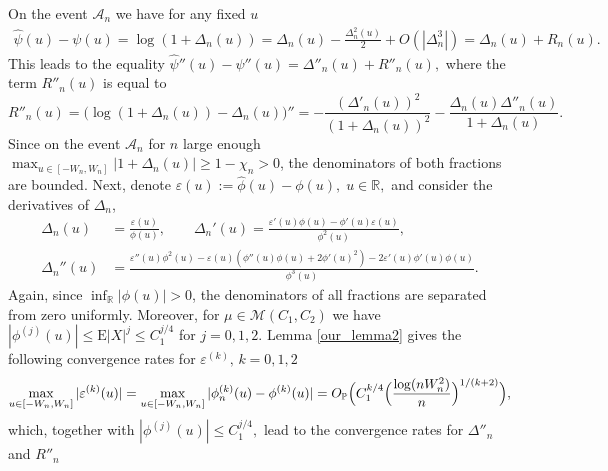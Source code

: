 \documentclass[numbers,webpdf,imaiai]{ima-authoring-template}%
\theoremstyle{thmstyletwo}%
\newcommand{\R}{\mathbb{R}}
\newcommand{\E}{\mathrm{E}}
\newcommand{\A}{\mathcal{A}}
\numberwithin{equation}{section}
\begin{document}
\begin{enumerate}
On the event $\A_n$ we have for any fixed $u$ 
\begin{align*}
    \widehat\psi(u) - \psi(u) = \log(1 + \Delta_n(u))
    = \Delta_n(u)  - \frac{\Delta_n^2(u)}{2} + O(|\Delta_n^3|) = \Delta_n(u) + R_n(u).
\end{align*}
This leads to the equality 
\(
    \widehat{\psi}''(u) - \psi''(u) = \Delta''_n(u) + R''_n(u),\)
where the term $R''_n(u)$ is equal to 
\begin{equation*}
    R''_n(u) = \bigl(    \log(1 + \Delta_n(u)) - \Delta_n(u) \bigr)'' = 
    -\frac{(\Delta'_n(u))^2}{(1 + \Delta_n(u))^2} - \frac{\Delta_n(u)\Delta''_n(u)}{1 + \Delta_n(u)}.
\end{equation*}
Since on the event $\A_n$ for $n$ large enough $\max_{u \in [-W_n, W_n]} |1 + \Delta_n(u)| \geq 1 - \chi_n > 0$, the  denominators of both fractions are bounded. Next, denote $\varepsilon (u) := \widehat{\phi}(u) - \phi(u), \; u \in \R,$ and consider the derivatives of $\Delta_n$,
\begin{align*}
    \Delta_n(u) &=  \frac{\varepsilon(u)}{\phi(u)}, \qquad 
    \Delta_n'(u) = \frac{\varepsilon'(u) \phi(u) - \phi'(u)\varepsilon(u)}{\phi^2(u)}, \\
    \Delta_n''(u) &= \frac{\varepsilon''(u)\phi^2(u)-\varepsilon(u) (\phi''(u)\phi(u) + 2\phi'(u)^2) - 2\varepsilon'(u)\phi'(u) \phi(u)}{\phi^3(u)}.
\end{align*}
Again, since  $\inf_{\R}|\phi(u)| >0$, the denominators of all fractions are separated from zero uniformly. Moreover, for $\mu\in\mathcal{M}(C_1,C_2)$ we have $|\phi^{(j)}(u)|\leq\E|X|^j\leq C_1^{j/4}$ for $j=0,1,2.$ %
Lemma \ref{our_lemma2} gives the following convergence rates for $\varepsilon^{(k)}, \, k=0,1,2$
\begin{equation*}
    \max_{u\in [-W_n, W_n]} |\varepsilon^{(k)}(u)| = \max_{u\in [-W_n, W_n]} |\phi^{(k)}_n(u) - \phi^{(k)}(u)| = O_{\mathbb{P}} \Bigl(C_1^{k/4}\Bigl(\frac{\log(nW^2_n)}{n}\Bigr)^{1/(k + 2)}\Bigr), 
\end{equation*}
which, together with $|\phi^{(j)}(u)|\leq C_1^{j/4},$ lead to the convergence rates for $\Delta''_n$ and $R''_n$
\begin{equation*}

\end{equation*}
\end{enumerate}
\end{document}
